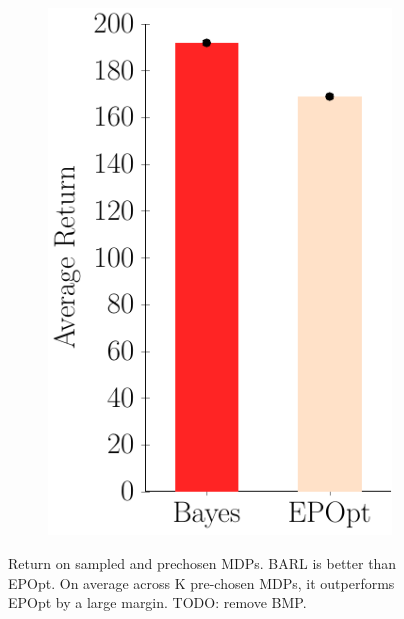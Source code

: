\documentclass{article}
\begin{document}
\begin{figure}[t!]
\begin{centering}
\begin{subfigure}[b]{0.38\columnwidth}
\end{subfigure}
~
\begin{subfigure}[b]{0.20\columnwidth}
\includegraphics[width=\linewidth]{figs/cheetah_average.pdf}
\end{subfigure}
\end{centering}
\caption{Return on sampled and prechosen MDPs. BARL is better than EPOpt. On average across K pre-chosen MDPs, it outperforms EPOpt by a large margin. TODO: remove BMP.}
\end{figure}
\end{document}
